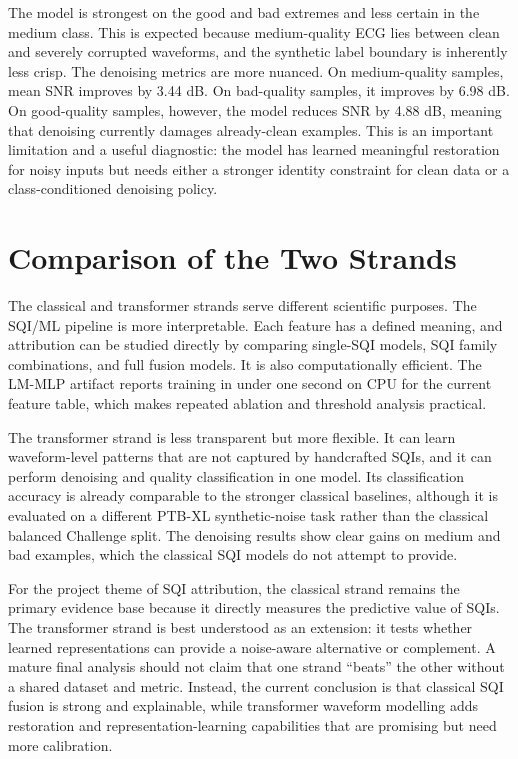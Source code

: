 \documentclass[11pt,a4paper]{article}
\begin{document}
The model is strongest on the good and bad extremes and less certain in the medium class. This is expected because medium-quality ECG lies between clean and severely corrupted waveforms, and the synthetic label boundary is inherently less crisp. The denoising metrics are more nuanced. On medium-quality samples, mean SNR improves by 3.44 dB. On bad-quality samples, it improves by 6.98 dB. On good-quality samples, however, the model reduces SNR by 4.88 dB, meaning that denoising currently damages already-clean examples. This is an important limitation and a useful diagnostic: the model has learned meaningful restoration for noisy inputs but needs either a stronger identity constraint for clean data or a class-conditioned denoising policy.

\section{Comparison of the Two Strands}

The classical and transformer strands serve different scientific purposes. The SQI/ML pipeline is more interpretable. Each feature has a defined meaning, and attribution can be studied directly by comparing single-SQI models, SQI family combinations, and full fusion models. It is also computationally efficient. The LM-MLP artifact reports training in under one second on CPU for the current feature table, which makes repeated ablation and threshold analysis practical.

The transformer strand is less transparent but more flexible. It can learn waveform-level patterns that are not captured by handcrafted SQIs, and it can perform denoising and quality classification in one model. Its classification accuracy is already comparable to the stronger classical baselines, although it is evaluated on a different PTB-XL synthetic-noise task rather than the classical balanced Challenge split. The denoising results show clear gains on medium and bad examples, which the classical SQI models do not attempt to provide.

For the project theme of SQI attribution, the classical strand remains the primary evidence base because it directly measures the predictive value of SQIs. The transformer strand is best understood as an extension: it tests whether learned representations can provide a noise-aware alternative or complement. A mature final analysis should not claim that one strand ``beats'' the other without a shared dataset and metric. Instead, the current conclusion is that classical SQI fusion is strong and explainable, while transformer waveform modelling adds restoration and representation-learning capabilities that are promising but need more calibration.
\end{document}
